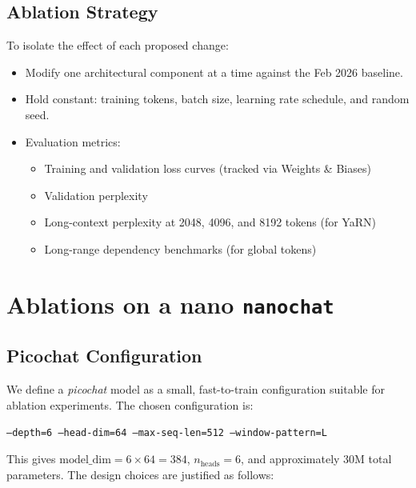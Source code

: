 \documentclass[a4paper,12pt]{article}
\begin{document}
\subsection{Ablation Strategy}

To isolate the effect of each proposed change:

\begin{itemize}
    \item Modify one architectural component at a time against the Feb 2026 baseline.
    \item Hold constant: training tokens, batch size, learning rate schedule, and random seed.
    \item Evaluation metrics:
    \begin{itemize}
        \item Training and validation loss curves (tracked via Weights \& Biases)
        \item Validation perplexity
        \item Long-context perplexity at 2048, 4096, and 8192 tokens (for YaRN)
        \item Long-range dependency benchmarks (for global tokens)
    \end{itemize}
\end{itemize}

\newpage

\section{Ablations on a nano \texttt{nanochat}}

\subsection{Picochat Configuration}

\noindent We define a \emph{picochat} model as a small, fast-to-train configuration
suitable for ablation experiments.  The chosen configuration is:

\begin{center}
\texttt{--depth=6 --head-dim=64 --max-seq-len=512 --window-pattern=L}
\end{center}

\noindent This gives $\text{model\_dim} = 6 \times 64 = 384$, $n_\text{heads} = 6$,
and approximately 30M total parameters.  The design choices are justified as
follows:
\end{document}
